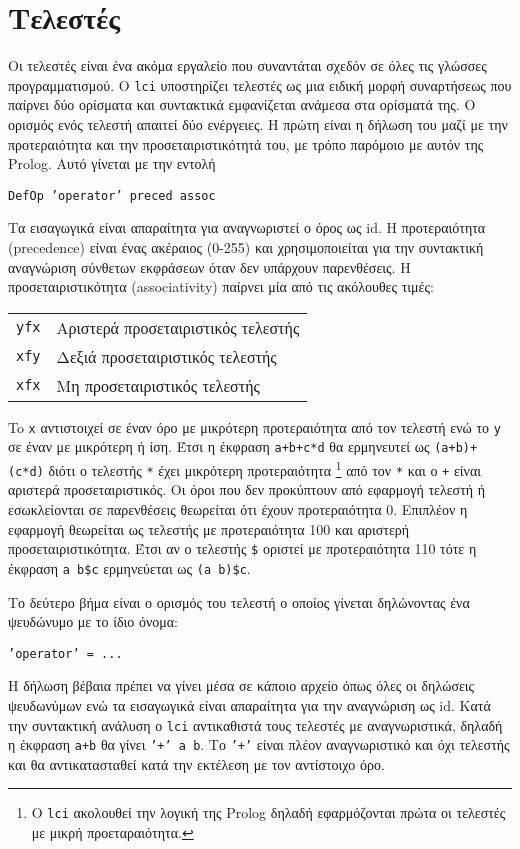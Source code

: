 \documentclass[a4paper,11pt]{article}
\newcommand{\lci}{\texttt{\en{lci}}}
\newcommand{\kwd}[1]{\en{\texttt{#1}}}
\newcommand{\en}[1]{\textlatin{#1}}
\begin{document}
\section{Τελεστές}
Οι τελεστές είναι ένα ακόμα εργαλείο που συναντάται σχεδόν σε όλες τις γλώσσες
προγραμματισμού. Ο \lci{} υποστηρίζει τελεστές ως μια ειδική μορφή συναρτήσεως
που παίρνει δύο ορίσματα και συντακτικά εμφανίζεται ανάμεσα στα ορίσματά της. Ο
ορισμός ενός τελεστή απαιτεί δύο ενέργειες. Η πρώτη είναι η δήλωση του μαζί με
την προτεραιότητα και την προσεταιριστικότητά του, με τρόπο παρόμοιο με αυτόν
της \en{Prolog}. Αυτό γίνεται με την εντολή
\begin{center}
	\kwd{DefOp 'operator' preced assoc}
\end{center}
Τα εισαγωγικά είναι απαραίτητα για αναγνωριστεί ο όρος ως \en{id}. Η προτεραιότητα
(\en{precedence}) είναι ένας ακέραιος (0-255) και χρησιμοποιείται για την συντακτική
αναγνώριση σύνθετων εκφράσεων όταν δεν υπάρχουν παρενθέσεις. Η προσεταιριστικότητα
(\en{associativity}) παίρνει μία από τις ακόλουθες τιμές:
\begin{center}
	\begin{tabular}{cl}
		\kwd{yfx} & Αριστερά προσεταιριστικός τελεστής \\
		\kwd{xfy} & Δεξιά προσεταιριστικός τελεστής \\
		\kwd{xfx} & Μη προσεταιριστικός τελεστής
	\end{tabular}
\end{center}

To \kwd{x} αντιστοιχεί σε έναν όρο με μικρότερη προτεραιότητα από τον
τελεστή ενώ το \kwd{y} σε έναν με μικρότερη ή ίση. Έτσι η έκφραση \kwd{a+b+c*d}
θα ερμηνευτεί ως \kwd{(a+b)+(c*d)} διότι ο τελεστής \kwd{*} έχει μικρότερη προτεραιότητα
\footnote{O \lci{} ακολουθεί την λογική της \en{Prolog} δηλαδή εφαρμόζονται πρώτα οι
	τελεστές με μικρή προεταραιότητα.}
από τον \kwd{*} και ο \kwd{+} είναι αριστερά προσεταιριστικός. Οι όροι που δεν προκύπτουν
από εφαρμογή τελεστή ή εσωκλείονται σε παρενθέσεις θεωρείται ότι έχουν προτεραιότητα 0.
Επιπλέον η εφαρμογή θεωρείται ως τελεστής με προτεραιότητα 100 και αριστερή
προσεταιριστικότητα. Έτσι αν ο τελεστής \kwd{\$} οριστεί με προτεραιότητα 110 τότε
η έκφραση \kwd{a b\$c} ερμηνεύεται ως \kwd{(a b)\$c}.

Το δεύτερο βήμα είναι ο ορισμός του τελεστή ο οποίος γίνεται δηλώνοντας ένα ψευδώνυμο
με το ίδιο όνομα:
\begin{center}
	\kwd{'operator' = ...}
\end{center}
Η δήλωση βέβαια πρέπει να γίνει μέσα σε κάποιο αρχείο όπως όλες οι δηλώσεις ψευδωνύμων
ενώ τα εισαγωγικά είναι απαραίτητα για την αναγνώριση ως \en{id}. Κατά την συντακτική
ανάλυση ο \lci{} αντικαθιστά τους τελεστές με αναγνωριστικά, δηλαδή η
έκφραση \kwd{a+b} θα γίνει \kwd{'+' a b}. Το \kwd{'+'} είναι πλέον αναγνωριστικό και
όχι τελεστής και θα αντικατασταθεί κατά την εκτέλεση με τον αντίστοιχο όρο.
\end{document}
